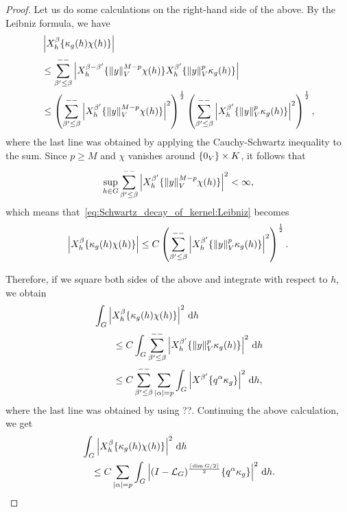 \begin{proof}
    Let us do some calculations on the right-hand side of the above.
    By the Leibniz formula, we have
    \begin{align}
        &\abs {\LeftDifferentialOperator [h] \beta \{\kappa_g(h) \chi(h)\}} \notag\\
        &\leq \lcsum {\beta' \leq \beta} \abs{\LeftDifferentialOperator [h] {\beta - \beta'} \{\norm y^{M - p} \chi(h)\} \LeftDifferentialOperator [h] {\beta'} \{\norm y^p \kappa_g(h)\}} \notag\\
        &\leq
        \left(\lcsum {\beta' \leq \beta} \abs{\LeftDifferentialOperator [h] {\beta'} \{\norm y^{M - p} \chi(h)\}}^2\right)^{\frac 1 2}
        \left(\lcsum {\beta' \leq \beta} \abs{\LeftDifferentialOperator [h] {\beta'} \{\norm y^p \kappa_g(h)\}}^2\right)^{\frac 1 2},
        \label{eq:Schwartz_decay_of_kernel:Leibniz}
    \end{align}
    where the last line was obtained by applying the Cauchy-Schwartz inequality to the sum.
    Since $p \geq M$ and $\chi$ vanishes around $\{0_V\} \times K$,
    it follows that
    \begin{align*}
        \sup_{h \in \Group} \lcsum {\beta' \leq \beta} \abs{\LeftDifferentialOperator [h] {\beta'} \{\norm y^{M - p} \chi(h)\}}^2 < \infty,
    \end{align*}
    which means that~\eqref{eq:Schwartz_decay_of_kernel:Leibniz} becomes
    \begin{align*}
        \abs {\LeftDifferentialOperator [h] \beta \{\kappa_g(h) \chi(h)\}}
        \leq C \left(\lcsum {\beta' \leq \beta} \abs{\LeftDifferentialOperator [h] {\beta'} \{\norm y^p \kappa_g(h)\}}^2\right)^{\frac 1 2}.
    \end{align*}

    Therefore, if we square both sides of the above and integrate with respect to $h$, we obtain
    \begin{align*}
        &\int_\Group \abs {\LeftDifferentialOperator [h] \beta \{\kappa_g(h) \chi(h)\}}^2 \dd h\\
        &\qquad \leq C \int_\Group \lcsum {\beta' \leq \beta} \abs{\LeftDifferentialOperator [h] {\beta'} \{\norm y^p \kappa_g(h)\}}^2 \dd h\\
        &\qquad \leq C \lcsum {\beta' \leq \beta} \sum_{\abs \alpha = p} \int_\Group \abs{\LeftDifferentialOperator {\beta'} \{q^\alpha \kappa_g\}}^2 \dd h,
    \end{align*}
    where the last line was obtained by using ??. %
    Continuing the above calculation,
    we get
    \begin{align*}
        &\int_\Group \abs {\LeftDifferentialOperator [h] \beta \{\kappa_g(h) \chi(h)\}}^2 \dd h\\
        &\quad \leq C \sum_{\abs \alpha = p} \int_\Group \abs{\BesselPotential {\Ceiling {\dim \Group / 2}} \{q^\alpha \kappa_g\}}^2 \dd h.
    \end{align*}


\end{proof}
